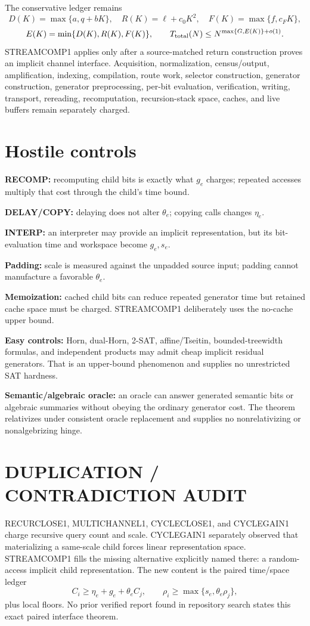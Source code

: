 \documentclass[11pt]{article}
\begin{document}
The conservative ledger remains
\[
D(K)=\max\{a,q+bK\},\quad
R(K)=\ell+c_0K^2,\quad
F(K)=\max\{f,c_FK\},
\]
\[
E(K)=\min\{D(K),R(K),F(K)\},\qquad
T_{\rm total}(N)\le N^{\max\{G,E(K)\}+o(1)}.
\]
STREAMCOMP1 applies only after a source-matched return construction proves an implicit channel interface. Acquisition, normalization, census/output, amplification, indexing, compilation, route work, selector construction, generator construction, generator preprocessing, per-bit evaluation, verification, writing, transport, rereading, recomputation, recursion-stack space, caches, and live buffers remain separately charged.

\section*{Hostile controls}
\textbf{RECOMP:} recomputing child bits is exactly what \(g_e\) charges; repeated accesses multiply that cost through the child's time bound.

\textbf{DELAY/COPY:} delaying does not alter \(\theta_e\); copying calls changes \(\eta_e\).

\textbf{INTERP:} an interpreter may provide an implicit representation, but its bit-evaluation time and workspace become \(g_e,s_e\).

\textbf{Padding:} scale is measured against the unpadded source input; padding cannot manufacture a favorable \(\theta_e\).

\textbf{Memoization:} cached child bits can reduce repeated generator time but retained cache space must be charged. STREAMCOMP1 deliberately uses the no-cache upper bound.

\textbf{Easy controls:} Horn, dual-Horn, 2-SAT, affine/Tseitin, bounded-treewidth formulas, and independent products may admit cheap implicit residual generators. That is an upper-bound phenomenon and supplies no unrestricted SAT hardness.

\textbf{Semantic/algebraic oracle:} an oracle can answer generated semantic bits or algebraic summaries without obeying the ordinary generator cost. The theorem relativizes under consistent oracle replacement and supplies no nonrelativizing or nonalgebrizing hinge.

\section*{DUPLICATION / CONTRADICTION AUDIT}
RECURCLOSE1, MULTICHANNEL1, CYCLECLOSE1, and CYCLEGAIN1 charge recursive query count and scale. CYCLEGAIN1 separately observed that materializing a same-scale child forces linear representation space. STREAMCOMP1 fills the missing alternative explicitly named there: a random-access implicit child representation. The new content is the paired time/space ledger
\[
C_i\ge\eta_e+g_e+\theta_eC_j,
\qquad
\rho_i\ge\max\{s_e,\theta_e\rho_j\},
\]
plus local floors. No prior verified report found in repository search states this exact paired interface theorem.
\end{document}
